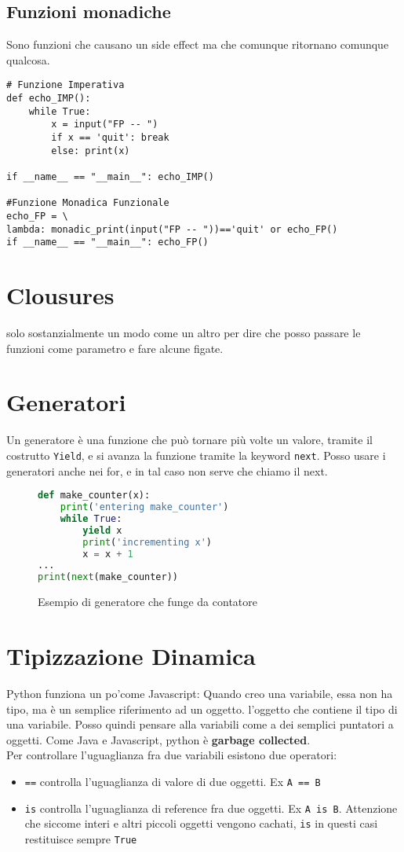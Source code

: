 \documentclass[a4paper,12pt]{article}
\begin{document}
\subsection{Funzioni monadiche}
Sono funzioni che causano un side effect ma che comunque ritornano comunque qualcosa.
\begin{lstlisting}
# Funzione Imperativa
def echo_IMP():
	while True:
		x = input("FP -- ")
		if x == 'quit': break
		else: print(x)
		
if __name__ == "__main__": echo_IMP()

#Funzione Monadica Funzionale
echo_FP = \
lambda: monadic_print(input("FP -- "))=='quit' or echo_FP()
if __name__ == "__main__": echo_FP()
\end{lstlisting}

\section{Clousures}
\E solo sostanzialmente un modo come un altro per dire che posso passare le funzioni come parametro e fare alcune figate.

\section{Generatori}
Un generatore è una funzione che può tornare più volte un valore, tramite il costrutto \texttt{Yield}, e si avanza la funzione tramite la keyword \texttt{next}. Posso usare i generatori anche nei for, e in tal caso non serve che chiamo il next.
\begin{figure}[H]
\begin{lstlisting}[language=python]
def make_counter(x):
	print('entering make_counter')
	while True:
		yield x
		print('incrementing x')
		x = x + 1
...
print(next(make_counter))
\end{lstlisting}
\caption{Esempio di generatore che funge da contatore}
\end{figure}

\section{Tipizzazione Dinamica}
Python funziona un po'come Javascript:
Quando creo una variabile, essa non ha tipo, ma è un semplice riferimento ad un oggetto. \E l'oggetto che contiene il tipo di una variabile. Posso quindi pensare alla variabili come a dei semplici puntatori a oggetti. Come Java e Javascript, python è \textbf{garbage collected}.\\
Per controllare l'uguaglianza fra due variabili esistono due operatori:
\begin{itemize}
\item \texttt{==} controlla l'uguaglianza di valore di due oggetti. Ex \texttt{A == B}
\item \texttt{is} controlla l'uguaglianza di reference fra due oggetti. Ex \texttt{A is B}. Attenzione che siccome interi e altri piccoli oggetti vengono cachati, \texttt{is} in questi casi restituisce sempre \texttt{True}
\end{itemize}
\end{document}
